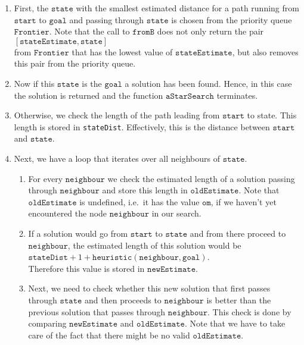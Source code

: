 \begin{enumerate}
\item First, the $\mathtt{state}$ with the smallest estimated distance for a path running from $\mathtt{start}$
      to $\mathtt{goal}$ and passing through $\mathtt{state}$ is chosen from the priority queue
      $\mathtt{Frontier}$.  Note that the call to $\mathtt{fromB}$ does not only return the pair
      \\[0.2cm]
      \hspace*{1.3cm}
      $[\mathtt{stateEstimate}, \mathtt{state}]$
      \\[0.2cm]
      from $\mathtt{Frontier}$ that has the lowest value of $\mathtt{stateEstimate}$, but also removes this
      pair from the priority queue.
\item Now if this $\mathtt{state}$ is the $\mathtt{goal}$ a solution has been found.  Hence, in this case the solution is returned 
      and the function $\mathtt{aStarSearch}$ terminates.
\item Otherwise, we check the length of the path leading from $\mathtt{start}$ to state.  This length is stored in 
      \texttt{stateDist}.  Effectively, this is the distance between $\mathtt{start}$ and $\mathtt{state}$.
\item Next, we have a loop that iterates over all neighbours of $\mathtt{state}$.
      \begin{enumerate}
      \item For every $\mathtt{neighbour}$ we check the estimated length of a solution passing through
            $\mathtt{neighbour}$ and store this length in $\mathtt{oldEstimate}$.   Note that
            $\mathtt{oldEstimate}$ is undefined, i.e.~it has the value $\mathtt{om}$, if we haven't yet encountered the node
            $\mathtt{neighbour}$ in our search.
      \item If a solution would go from $\mathtt{start}$ to $\mathtt{state}$ and from there proceed to
            $\mathtt{neighbour}$, the estimated length of this solution would be
            \\[0.2cm]
            \hspace*{1.3cm}
            $\mathtt{stateDist} + 1 + \mathtt{heuristic}(\mathtt{neighbour}, \mathtt{goal})$.
            \\[0.2cm]
            Therefore this value is stored in $\mathtt{newEstimate}$.  
      \item Next, we need to check whether this new solution that first passes through $\mathtt{state}$ and
            then proceeds to $\mathtt{neighbour}$ is better than the previous solution that passes through
            $\mathtt{neighbour}$.  This check is done by comparing $\mathtt{newEstimate}$ and
            $\mathtt{oldEstimate}$.  Note that we have to take care of the fact that there might be no valid
            $\mathtt{oldEstimate}$.


\end{enumerate}
\end{enumerate}
